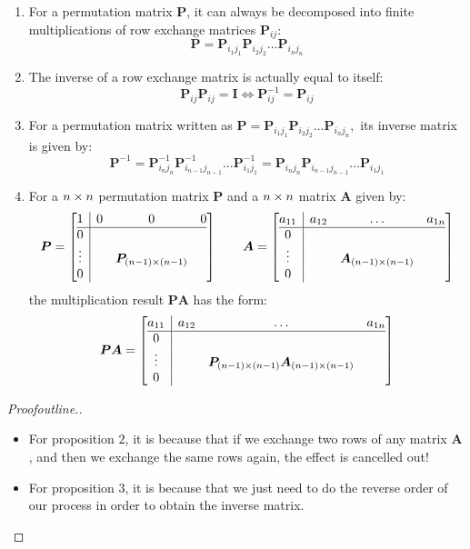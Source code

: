 \begin{proposition}
\begin{enumerate}
\item
For a permutation matrix $\bm P$, it can always be decomposed into finite multiplications of row
exchange matrices $\bm P_{ij}$:
\[
\bm P=\bm P_{i_1j_1}\bm P_{i_2j_2}\ldots\bm P_{i_nj_n}
\]
\item
The inverse of a row exchange matrix is actually equal to itself:
\[
\bm P_{ij}\bm P_{ij}=\bm I
\Longleftrightarrow
\bm P_{ij}^{-1}=\bm P_{ij}
\]
\item
For a permutation matrix written as $\bm P=\bm P_{i_1j_1}\bm P_{i_2j_2}\ldots\bm P_{i_nj_n},$ its inverse matrix is given by:
\[
\bm P^{-1}=\bm P_{i_nj_n}^{-1}\bm P_{i_{n-1}j_{n-1}}^{-1}\ldots\bm P_{i_1j_1}^{-1}
=\bm P_{i_nj_n}\bm P_{i_{n-1}j_{n-1}}\ldots\bm P_{i_1j_1}
\]
\item
For a $n\times n$ permutation matrix $\bm P$ and a $n\times n$ matrix $\bm A$ given by:
\[
\bm P=\left[\begin{array}{@{}c|ccc@{}}
1&0&0&0\\
\hline
0&&&\\
\vdots&&\bm P_{(n-1)\x(n-1)}&\\
0&&&
\end{array}\right]\qquad
\bm A=\left[\begin{array}{@{}c|ccc@{}}
a_{11}&a_{12}&\dots&a_{1n}\\
\hline
0&&&\\
\vdots&&\bm A_{(n-1)\x(n-1)}&\\
0&&&
\end{array}\right]
\]
the multiplication result $\bm{PA}$ has the form:
\[
\bm P\bm A=\left[\begin{array}{@{}c|ccc@{}}
a_{11}&a_{12}&\dots&a_{1n}\\
\hline
0&&&\\
\vdots&&\bm P_{(n-1)\x(n-1)}\bm A_{(n-1)\x(n-1)}&\\
0&&&
\end{array}\right]
\]
\end{enumerate}
\end{proposition}
\begin{proof}[Proofoutline.]
\begin{itemize}
\item
For proposition $2$, it is because that if we exchange two rows of any matrix $\bm A$, and then we
exchange the same rows again, the effect is cancelled out!
\item
For proposition 3, it is because that we just need to do  the reverse order of our process in order to
obtain the inverse matrix.
\end{itemize}
\end{proof}
